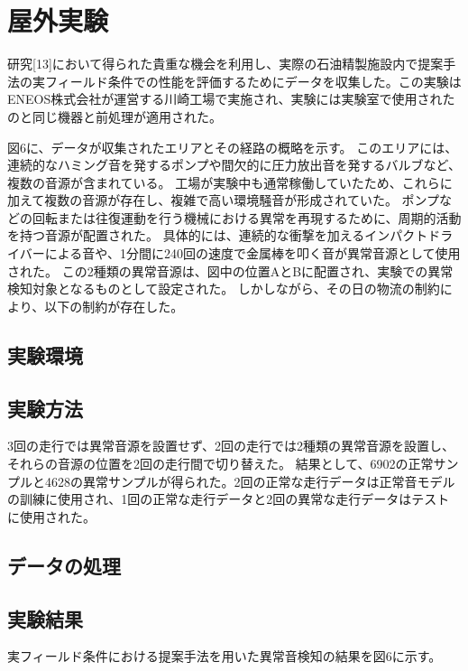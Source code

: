 \documentclass[../main]{subfiles}
\begin{document}
\section{屋外実験}
\label{sec:vexp_cone-index}
研究[13]において得られた貴重な機会を利用し、実際の石油精製施設内で提案手法の実フィールド条件での性能を評価するためにデータを収集した。この実験はENEOS株式会社が運営する川崎工場で実施され、実験には実験室で使用されたのと同じ機器と前処理が適用された。

図6に、データが収集されたエリアとその経路の概略を示す。
このエリアには、連続的なハミング音を発するポンプや間欠的に圧力放出音を発するバルブなど、複数の音源が含まれている。
工場が実験中も通常稼働していたため、これらに加えて複数の音源が存在し、複雑で高い環境騒音が形成されていた。
ポンプなどの回転または往復運動を行う機械における異常を再現するために、周期的活動を持つ音源が配置された。
具体的には、連続的な衝撃を加えるインパクトドライバーによる音や、1分間に240回の速度で金属棒を叩く音が異常音源として使用された。
この2種類の異常音源は、図中の位置AとBに配置され、実験での異常検知対象となるものとして設定された。
しかしながら、その日の物流の制約により、以下の制約が存在した。

\subsection{実験環境}
\label{subsec:vexp_ci_environment}

\subsection{実験方法}
\label{subsec:vexp_ci_method}
3回の走行では異常音源を設置せず、2回の走行では2種類の異常音源を設置し、それらの音源の位置を2回の走行間で切り替えた。
結果として、6902の正常サンプルと4628の異常サンプルが得られた。2回の正常な走行データは正常音モデルの訓練に使用され、1回の正常な走行データと2回の異常な走行データはテストに使用された。

\subsection{データの処理}
\label{subsec:vexp_ci_processing}

\subsection{実験結果}
\label{subsec:vexp_ci_result}
実フィールド条件における提案手法を用いた異常音検知の結果を図6に示す。
\end{document}
